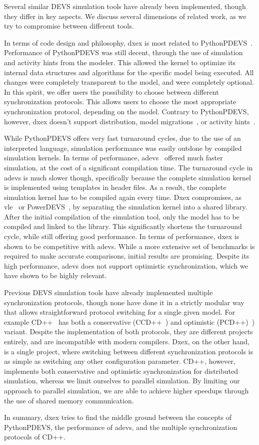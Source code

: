 Several similar \textsf{DEVS} simulation tools have already been implemented, though they differ in key aspects.
We discuss several dimensions of related work, as we try to compromise between different tools.

In terms of code design and philosophy, dxex is most related to PythonPDEVS~\cite{PythonPDEVS}.
Performance of PythonPDEVS was still decent, through the use of simulation and activity hints from the modeler.
This allowed the kernel to optimize its internal data structures and algorithms for the specific model being executed.
All changes were completely transparent to the model, and were completely optional.
In this spirit, we offer users the possibility to choose between different synchronization protocols.
This allows users to choose the most appropriate synchronization protocol, depending on the model.
Contrary to PythonPDEVS, however, dxex doesn't support distribution, model migrations~\cite{PythonPDEVS2}, or activity hints~\cite{PythonPDEVS_ACTIMS}.

While PythonPDEVS offers very fast turnaround cycles, due to the use of an interpreted language, simulation performance was easily outdone by compiled simulation kernels.
In terms of performance, adevs~\cite{adevs} offered much faster simulation, at the cost of a significant compilation time.
The turnaround cycle in adevs is much slower though, specifically because the complete simulation kernel is implemented using templates in header files.
As a result, the complete simulation kernel has to be compiled again every time.
Dxex compromises, as vle~\cite{vle} or PowerDEVS~\cite{PowerDEVS}, by separating the simulation kernel into a shared library.
After the initial compilation of the simulation tool, only the model has to be compiled and linked to the library.
This significantly shortens the turnaround cycle, while still offering good performance.
In terms of performance, dxex is shown to be competitive with adevs.
While a more extensive set of benchmarks is required to make accurate comparisons, initial results are promising.
Despite its high performance, adevs does not support optimistic synchronization, which we have shown to be highly relevant.

Previous \textsf{DEVS} simulation tools have already implemented multiple synchronization protocols, though none have done it in a strictly modular way that allows straightforward protocol switching for a single given model.
For example CD++~\cite{CD++} has both a conservative (CCD++~\cite{CCD++}) and optimistic (PCD++)~\cite{PCD++}) variant.
Despite the implementation of both protocols, they are different projects entirely, and are incompatible with modern compilers.
Dxex, on the other hand, is a single project, where switching between different synchronization protocols is as simple as switching any other configuration parameter.
CD++, however, implements both conservative and optimistic synchronization for distributed simulation, whereas we limit ourselves to parallel simulation.
By limiting our approach to parallel simulation, we are able to achieve higher speedups through the use of shared memory communication.

In summary, dxex tries to find the middle ground between the concepts of PythonPDEVS, the performance of adevs, and the multiple synchronization protocols of CD++.
